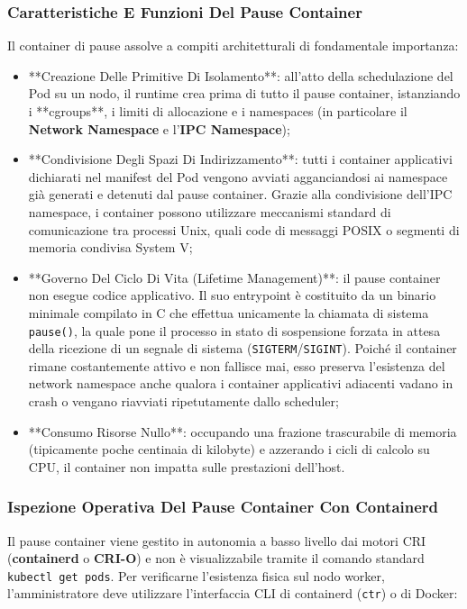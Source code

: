 \documentclass[11pt, a4paper]{article}
\begin{document}
\subsubsection{Caratteristiche E Funzioni Del Pause Container}
Il container di pause assolve a compiti architetturali di fondamentale importanza:
\begin{itemize}
    \item **Creazione Delle Primitive Di Isolamento**: all'atto della schedulazione del Pod su un nodo, il runtime crea prima di tutto il pause container, istanziando i **cgroups**, i limiti di allocazione e i namespaces (in particolare il \textbf{Network Namespace} e l'\textbf{IPC Namespace});
    \item **Condivisione Degli Spazi Di Indirizzamento**: tutti i container applicativi dichiarati nel manifest del Pod vengono avviati agganciandosi ai namespace già generati e detenuti dal pause container. Grazie alla condivisione dell'IPC namespace, i container possono utilizzare meccanismi standard di comunicazione tra processi Unix, quali code di messaggi POSIX o segmenti di memoria condivisa System V;
    \item **Governo Del Ciclo Di Vita (Lifetime Management)**: il pause container non esegue codice applicativo. Il suo entrypoint è costituito da un binario minimale compilato in C che effettua unicamente la chiamata di sistema \texttt{pause()}, la quale pone il processo in stato di sospensione forzata in attesa della ricezione di un segnale di sistema (\texttt{SIGTERM}/\texttt{SIGINT}). Poiché il container rimane costantemente attivo e non fallisce mai, esso preserva l'esistenza del network namespace anche qualora i container applicativi adiacenti vadano in crash o vengano riavviati ripetutamente dallo scheduler;
    \item **Consumo Risorse Nullo**: occupando una frazione trascurabile di memoria (tipicamente poche centinaia di kilobyte) e azzerando i cicli di calcolo su CPU, il container non impatta sulle prestazioni dell'host.
\end{itemize}

\subsubsection{Ispezione Operativa Del Pause Container Con Containerd}
Il pause container viene gestito in autonomia a basso livello dai motori CRI (\textbf{containerd} o \textbf{CRI-O}) e non è visualizzabile tramite il comando standard \texttt{kubectl get pods}. Per verificarne l'esistenza fisica sul nodo worker, l'amministratore deve utilizzare l'interfaccia CLI di containerd (\texttt{ctr}) o di Docker:
\end{document}
